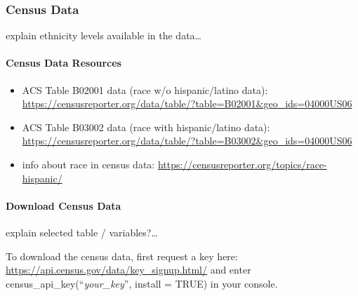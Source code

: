 \documentclass[
]{article}
\providecommand{\tightlist}{%
  \setlength{\itemsep}{0pt}\setlength{\parskip}{0pt}}
\begin{document}
\hypertarget{census-data-1}{%
\subsubsection{Census Data}\label{census-data-1}}

explain ethnicity levels available in the data\ldots{}

\hypertarget{census-data-resources}{%
\paragraph{Census Data Resources}\label{census-data-resources}}

\begin{itemize}
\tightlist
\item
  ACS Table B02001 data (race w/o hispanic/latino data):
  \url{https://censusreporter.org/data/table/?table=B02001\&geo_ids=04000US06}
\item
  ACS Table B03002 data (race with hispanic/latino data):
  \url{https://censusreporter.org/data/table/?table=B03002\&geo_ids=04000US06}
\item
  info about race in census data:
  \url{https://censusreporter.org/topics/race-hispanic/}
\end{itemize}

\hypertarget{download-census-data}{%
\paragraph{Download Census Data}\label{download-census-data}}

explain selected table / variables?\ldots{}

To download the census data, first request a key here:
\url{https://api.census.gov/data/key_signup.html/} and enter
census\_api\_key(``\emph{your\_key}'', install = TRUE) in your console.
\end{document}
